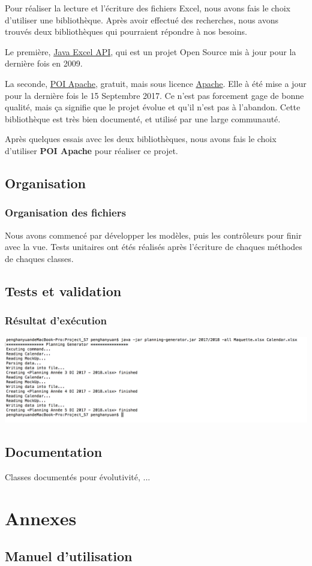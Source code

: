 \documentclass{polytech/polytech}
\begin{document}
	Pour réaliser la lecture et l'écriture des fichiers Excel, nous avons fais le choix d'utiliser une bibliothèque.
	Après avoir effectué des recherches, nous avons trouvés deux bibliothèques qui pourraient répondre à nos besoins.
	
	Le première, \href{http://jexcelapi.sourceforge.net/}{Java Excel API}, qui est un projet Open Source mis à jour pour la dernière fois en 2009.
	
	La seconde, \href{http://poi.apache.org}{POI Apache}, gratuit, mais sous licence \href{https://www.apache.org/licenses/}{Apache}.
	Elle à été mise a jour pour la dernière fois le 15 Septembre 2017.
	Ce n'est pas forcement gage de bonne qualité, mais ça signifie que le projet évolue et qu'il n'est pas à l'abandon.
	Cette bibliothèque est très bien documenté, et utilisé par une large communauté.
	
	Après quelques essais avec les deux bibliothèques, nous avons fais le choix d'utiliser \textbf{POI Apache} pour réaliser ce projet.	

	\section{Organisation}

	\subsection{Organisation des fichiers}

	Nous avons commencé par développer les modèles, puis les contrôleurs pour finir avec la vue.
	Tests unitaires ont étés réalisés après l'écriture de chaques méthodes de chaques classes.

	\section{Tests et validation}
	\subsection{Résultat d'exécution}
	\includegraphics[width=\textwidth]{./img/excution_result.png}
	\section{Documentation}

	Classes documentés pour évolutivité, ...

	\chapter{Annexes}

	\section{Manuel d'utilisation}
	
\end{document}
